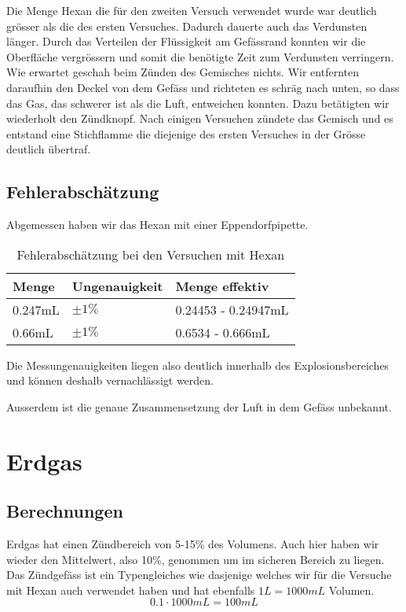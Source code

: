 \documentclass[11pt,paper=a4,final]{scrartcl}
\begin{document}
Die Menge Hexan die f\"ur den zweiten Versuch verwendet wurde war deutlich
gr\"osser als die des ersten Versuches. Dadurch dauerte auch das Verdunsten
l\"anger. Durch das Verteilen der Fl\"ussigkeit am Gef\"assrand konnten wir die
Oberfl\"ache vergr\"ossern und somit die ben\"otigte Zeit zum Verdunsten
verringern. Wie erwartet geschah beim Z\"unden des Gemisches nichts. Wir
entfernten daraufhin den Deckel von dem Gef\"ass und richteten es schr\"ag nach
unten, so dass das Gas, das schwerer ist als die Luft, entweichen konnten. Dazu
bet\"atigten wir wiederholt den Z\"undknopf. Nach einigen Versuchen z\"undete
das Gemisch und es entstand eine Stichflamme die diejenige des ersten Versuches
in der Gr\"osse deutlich \"ubertraf.
\subsection{Fehlerabsch\"atzung}
Abgemessen haben wir das Hexan mit einer Eppendorfpipette.
\begin{table}[h!]
  \centering
  \begin{tabular}{|l|l|l|}\hline
    \bf Menge	& \bf Ungenauigkeit	& \bf Menge effektiv	\\
    \hline
    0.247mL	& \(\pm 1\%\)	&	0.24453 - 0.24947mL	\\
    \hline
    0.66mL	& \(\pm 1\%\)	&	0.6534 - 0.666mL	\\
    \hline
  \end{tabular}
  \caption{Fehlerabsch\"atzung bei den Versuchen mit Hexan}
  \label{tab:}
\end{table}
Die Messungenauigkeiten liegen also deutlich innerhalb des Explosionsbereiches
und k\"onnen deshalb vernachl\"assigt werden.

Ausserdem ist die genaue Zusammensetzung der Luft in dem Gef\"ass unbekannt.
\section{Erdgas}
\subsection{Berechnungen}
Erdgas hat einen Z\"undbereich von 5-15\% des Volumens. Auch hier haben wir
wieder den Mittelwert, also 10\%, genommen um im sicheren Bereich zu liegen. Das
Z\"undgef\"ass ist ein Typengleiches wie dasjenige welches wir f\"ur die
Versuche mit Hexan auch verwendet haben und hat ebenfalls \(1L = 1000mL\)
Volumen.
\[ 0.1 \cdot 1000mL = 100mL \]
\end{document}

